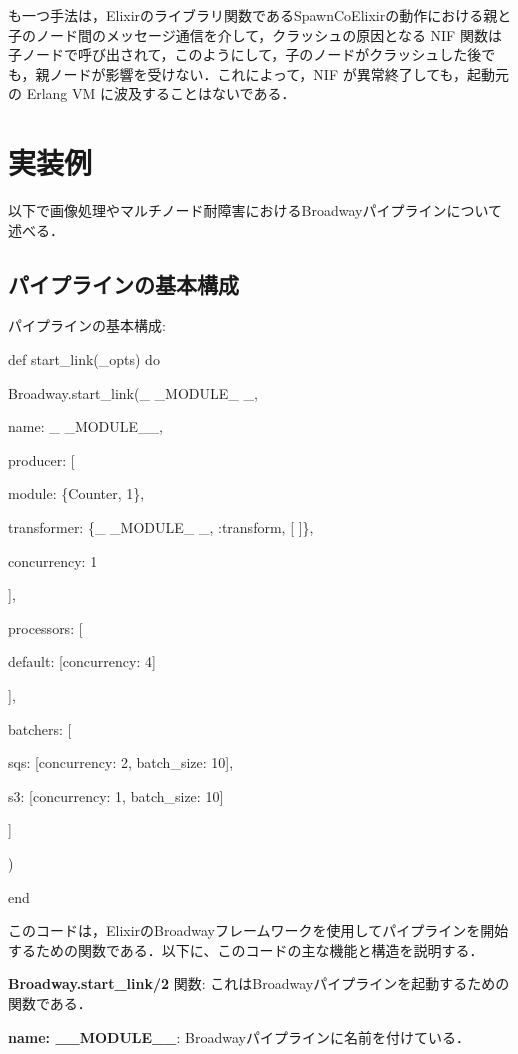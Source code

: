 \documentclass[a4paper]{jreport}	%
\begin{document}
も一つ手法は，Elixirのライブラリ関数であるSpawnCoElixirの動作における親と子のノード間のメッセージ通信を介して，クラッシュの原因となる NIF 関数は子ノードで呼び出されて，このようにして，子のノードがクラッシュした後でも，親ノードが影響を受けない．これによって，NIF が異常終了しても，起動元の Erlang VM に波及することはないである．

\section{実装例}
以下で画像処理やマルチノード耐障害におけるBroadwayパイプラインについて述べる．
\subsection{パイプラインの基本構成}
パイプラインの基本構成:

def start\_link(\_opts) do

    Broadway.start\_link(\_ \_MODULE\_ \_,
    
      name: \_ \_MODULE\_\_,
      
      producer: [
      
        module: \{Counter, 1\},
        
        transformer: \{\_ \_MODULE\_ \_, :transform, [ ]\},
        
        concurrency: 1
        
       ],
       
      processors: [
      
        default: [concurrency: 4]
        
      ],
      
        batchers: [
        
        sqs: [concurrency: 2, batch\_size: 10],
        
        s3: [concurrency: 1, batch\_size: 10]
        
      ]
      
    )
    
end

このコードは，ElixirのBroadwayフレームワークを使用してパイプラインを開始するための関数である．以下に、このコードの主な機能と構造を説明する．

\textbf{Broadway.start\_link/2 }関数: これはBroadwayパイプラインを起動するための関数である．

\textbf{name: \_\_MODULE\_\_}: Broadwayパイプラインに名前を付けている．
\end{document}
